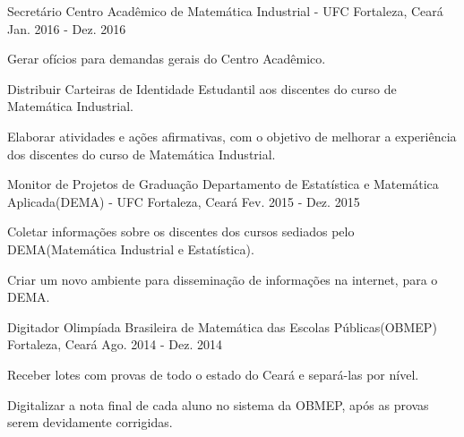 \begin{cventries}
  \cventry
    {Secretário} %
    {Centro Acadêmico de Matemática Industrial - UFC} %
    {Fortaleza, Ceará} %
    {Jan. 2016 - Dez. 2016} %
    {
      \begin{cvitems} %
        \item {Gerar ofícios para demandas gerais do Centro Acadêmico.}
        \item {Distribuir Carteiras de Identidade Estudantil aos discentes do curso de Matemática Industrial.}
        \item {Elaborar atividades e ações afirmativas, com o objetivo de melhorar a experiência dos discentes do curso de Matemática Industrial.}
      \end{cvitems}
    }
\vskip 0.2cm
  \cventry
    {Monitor de Projetos de Graduação} %
    {Departamento de Estatística e Matemática Aplicada(DEMA) - UFC} %
    {Fortaleza, Ceará} %
    {Fev. 2015 - Dez. 2015} %
    {
      \begin{cvitems} %
        \item {Coletar informações sobre os discentes dos cursos sediados pelo DEMA(Matemática Industrial e Estatística).}
        \item {Criar um novo ambiente para disseminação de informações na internet, para o DEMA.}
      \end{cvitems}
    }
\vskip 0.2cm
  \cventry
    {Digitador} %
    {Olimpíada Brasileira de Matemática das Escolas Públicas(OBMEP) } %
    {Fortaleza, Ceará} %
    {Ago. 2014 - Dez. 2014} %
    {
      \begin{cvitems} %
        \item {Receber lotes com provas de todo o estado do Ceará e separá-las por nível.}
        \item {Digitalizar a nota final de cada aluno no sistema da OBMEP, após as provas serem devidamente corrigidas.}
      \end{cvitems}
    }
\end{cventries}
